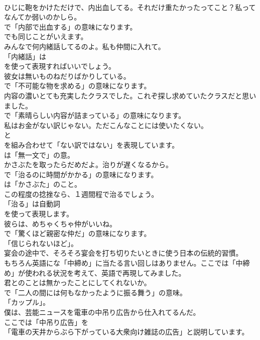 \documentclass[8pt]{extreport}
\begin{document}
\begin{CJK}{UTF8}{min}
\\	ひじに鞄をかけただけで、内出血してる。それだけ重たかったってこと？私ってなんてか弱いのかしら。 
\\	で「内部で出血する」の意味になります。
\\	でも同じことがいえます。	
\\	みんなで何内緒話してるのよ。私も仲間に入れて。 
\\	「内緒話」は
\\	を使って表現すればいいでしょう。	
\\	彼女は無いものねだりばかりしている。 
\\	で「不可能な物を求める」の意味になります。	
\\	内容の濃いとても充実したクラスでした。これぞ探し求めていたクラスだと思いました。 
\\	で「素晴らしい内容が詰まっている」の意味になります。	
\\	私はお金がない訳じゃない。ただこんなことには使いたくない。 
\\	と 
\\	を組み合わせて「ない訳ではない」を表現しています。
\\	は「無一文で」の意。	
\\	かさぶたを取ったらだめだよ。治りが遅くなるから。 
\\	で「治るのに時間がかかる」の意味になります。
\\	は「かさぶた」のこと。	
\\	この程度の捻挫なら、１週間程で治るでしょう。 
\\	「治る」は自動詞
\\	を使って表現します。	
\\	彼らは、めちゃくちゃ仲がいいね。 
\\	で「驚くほど親密な仲だ」の意味になります。
\\	「信じられないほど」。	
\\	宴会の途中で、そろそろ宴会を打ち切りたいときに使う日本の伝統的習慣。 
\\	もちろん英語にな「中締め」に当たる言い回しはありません。ここでは「中締め」が使われる状況を考えて、英語で再現してみました。	
\\	君とのことは無かったことにしてくれないか。 
\\	で「二人の間には何もなかったように振る舞う」の意味。
\\	「カップル」。	
\\	僕は、芸能ニュースを電車の中吊り広告から仕入れてるんだ。 
\\	ここでは「中吊り広告」を
\\	「電車の天井からぶら下がっている大衆向け雑誌の広告」と説明しています。	

\end{CJK}
\end{document}
